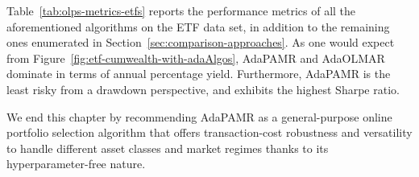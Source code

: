 \begin{mccorrection}
Table~\ref{tab:olps-metrics-etfs} reports the performance metrics of all the aforementioned algorithms on the ETF data set, in addition to the remaining ones enumerated in Section~\ref{sec:comparison-approaches}. As one would expect from Figure~\ref{fig:etf-cumwealth-with-adaAlgos}, AdaPAMR and AdaOLMAR dominate in terms of annual percentage yield. Furthermore, AdaPAMR is the least risky from a drawdown perspective, and exhibits the highest Sharpe ratio.
\end{mccorrection}
\begin{table}
  \caption{Performance metrics achieved by various OLPS algorithms on the ETF data set from Table~\ref{tab:etf-dataset}, subject to transaction fees of 0.1\%. The top two results are highlighted in \textbf{bold}.}
  \label{tab:olps-metrics-etfs}
  \centering
\end{table}

We end this chapter by recommending AdaPAMR as a general-purpose online portfolio selection algorithm that offers transaction-cost robustness and versatility to handle different asset classes and market regimes thanks to its hyperparameter-free nature.